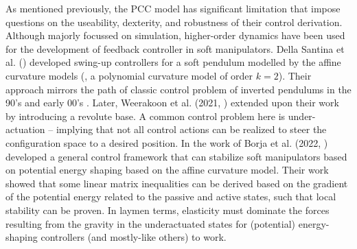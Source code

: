 As mentioned previously, the PCC model has significant limitation that impose questions on the useability, dexterity, and robustness of their control derivation. Although majorly focussed on simulation, higher-order dynamics have been used for the development of feedback controller in soft manipulators. Della Santina et al. (\cite{DellaSantina2021}) developed swing-up controllers for a soft pendulum modelled by the affine curvature models (\ie, a polynomial curvature model \cite{DellaSantina2020} of order $k = 2$). Their approach mirrors the path of classic control problem of inverted pendulums in the 90's and early 00's \cite{Spong1996,Spong1996a,Ortega1998,Shiriaev1999Dec}. Later, Weerakoon et al. (2021, \cite{Weerakoon2021Dec}) extended upon their work by introducing a revolute base. A common control problem here is under-actuation \cite{Tedrake2022,Spong2006,Murray1994} -- implying that not all control actions can be realized to steer the configuration space to a desired position. In the work of Borja et al. (2022, \cite{Borja2022Apr}) developed a general control framework that can stabilize soft manipulators based on potential energy shaping based on the affine curvature model. Their work showed that some linear matrix inequalities can be derived based on the gradient of the potential energy related to the passive and active states, such that local stability can be proven. In laymen terms, elasticity must dominate the forces resulting from the gravity in the underactuated states for (potential) energy-shaping controllers (and mostly-like others) to work. 

%   

